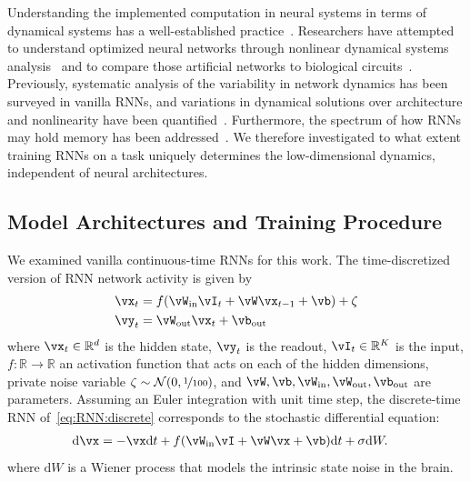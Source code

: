 \documentclass{article} %
\newcounter{ct}
\newcommand{\dm}[1]{\ensuremath{\mathrm{d}{#1}}} %
\newcommand{\win}{\vW_{\text{in}}}
\newcommand{\wout}{\vW_{\text{out}}}
\newcommand{\bout}{\vb_{\text{out}}}
\newcommand{\reals}{\mathbb{R}}
\theoremstyle{definition}
\theoremstyle{remark}
\begin{document}
Understanding the implemented computation in neural systems in terms of dynamical systems has a well-established practice~\citep{seung1996,sompolinsky1988}.
Researchers have attempted to understand optimized neural networks through nonlinear dynamical systems analysis~\citep{sussillo2013blackbox,sussillo2014,barak2013,driscoll2022,maheswaranathan2019universality,cueva2019headdirection,cueva2021continuous} and to compare those artificial networks to biological circuits~\citep{mante2013context,remington2018flexible,ghazizadeh2021slow}.
%
Previously, systematic analysis of the variability in network dynamics has been surveyed in vanilla RNNs, and variations in dynamical solutions over architecture and nonlinearity have been quantified~\citep{sussillo2013blackbox,mante2013context,yang2019task,maheswaranathan2019universality,driscoll2022}.
Furthermore, the spectrum of how RNNs may hold memory has been addressed~\citep{orhan2019diverse}.
We therefore investigated to what extent training RNNs on a task uniquely determines the low-dimensional dynamics, independent of neural architectures.

\subsection{Model Architectures and Training Procedure}
We examined vanilla continuous-time RNNs for this work.
The time-discretized version of RNN network activity is given by
\begin{equation}
  \begin{aligned}
	\vx_t &= f(\win \vI_t + \vW \vx_{t-1} + \vb) + \zeta \label{eq:RNN:discrete}\\
	\vy_t &= \wout \vx_t + \bout
  \end{aligned}
\end{equation}
where \(\vx_t \in \reals^d\) is the hidden state,
\(\vy_t \) is the readout,
\(\vI_t \in \reals^K\) is the input,
\(f\colon \reals \to \reals\) an activation function that acts on each of the hidden dimensions,
private noise variable \(\zeta\sim\mathcal{N}(0,\nicefrac{1}{100})\), and %
\(\vW, \vb, \win, \wout, \bout\) are parameters.
Assuming an Euler integration with unit time step, the discrete-time RNN of~\eqref{eq:RNN:discrete} corresponds to the stochastic differential equation:
\begin{align}
    \dm{\vx} &= -\vx\dm{t} + f(\win \vI + \vW \vx + \vb)\dm{t} + \sigma \dm{W}. \label{eq:RNN:continuous}
\end{align}
where \(\dm{W}\) is a Wiener process that models the intrinsic state noise in the brain.
\end{document}
